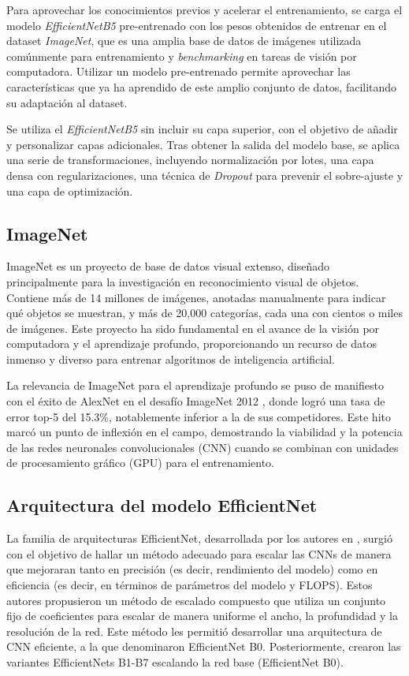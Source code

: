 Para aprovechar los conocimientos previos y acelerar el entrenamiento, se carga el modelo \textit{EfficientNetB5} pre-entrenado con los pesos obtenidos de entrenar en el dataset \textit{ImageNet}, que es una amplia base de datos de imágenes utilizada comúnmente para entrenamiento y \textit{benchmarking} en tareas de visión por computadora. Utilizar un modelo pre-entrenado permite aprovechar las características que ya ha aprendido de este amplio conjunto de datos, facilitando su adaptación al dataset.

Se utiliza el \textit{EfficientNetB5} sin incluir su capa superior, con el objetivo de añadir y personalizar capas adicionales. Tras obtener la salida del modelo base, se aplica una serie de transformaciones, incluyendo normalización por lotes, una capa densa con regularizaciones, una técnica de \textit{Dropout} para prevenir el sobre-ajuste y una capa de optimización. 

\subsection{ImageNet}

ImageNet es un proyecto de base de datos visual extenso, diseñado principalmente para la investigación en reconocimiento visual de objetos. Contiene más de 14 millones de imágenes, anotadas manualmente para indicar qué objetos se muestran, y más de 20,000 categorías, cada una con cientos o miles de imágenes. Este proyecto ha sido fundamental en el avance de la visión por computadora y el aprendizaje profundo, proporcionando un recurso de datos inmenso y diverso para entrenar algoritmos de inteligencia artificial.

La relevancia de ImageNet para el aprendizaje profundo se puso de manifiesto con el éxito de AlexNet en el desafío ImageNet 2012 , donde logró una tasa de error top-5 del 15.3\%, notablemente inferior a la de sus competidores. Este hito marcó un punto de inflexión en el campo, demostrando la viabilidad y la potencia de las redes neuronales convolucionales (CNN) cuando se combinan con unidades de procesamiento gráfico (GPU) para el entrenamiento.

\subsection{Arquitectura del modelo EfficientNet}

La familia de arquitecturas EfficientNet, desarrollada por los autores en , surgió con el objetivo de hallar un método adecuado para escalar las CNNs de manera que mejoraran tanto en precisión (es decir, rendimiento del modelo) como en eficiencia (es decir, en términos de parámetros del modelo y FLOPS). Estos autores propusieron un método de escalado compuesto que utiliza un conjunto fijo de coeficientes para escalar de manera uniforme el ancho, la profundidad y la resolución de la red. Este método les permitió desarrollar una arquitectura de CNN eficiente, a la que denominaron EfficientNet B0. Posteriormente, crearon las variantes EfficientNets B1-B7 escalando la red base (EfficientNet B0).

